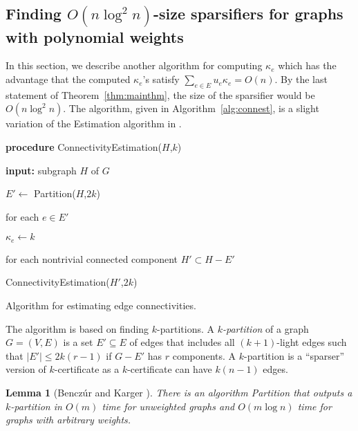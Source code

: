 \documentclass[11pt]{article}
\numberwithin{equation}{section}
\newenvironment{alg}{
    \begin{list}{}{
        \setlength{\itemsep}{2pt}
        \setlength{\parsep}{0pt}
        \setlength{\parskip}{0pt}
        \setlength{\topsep}{1pt}
    }
}
{
    \end{list}
}
\newtheorem{lemma}[theorem]{Lemma}
\newcommand{\AlgorithmName}[1]{\label{alg:#1}}
\newcommand{\Algorithm}[1]{Algorithm~\ref{alg:#1}}
\newcommand{\Theorem}[1]{Theorem~\ref{thm:#1}}
\begin{document}
\subsection{Finding $O(n\log^2 n)$-size sparsifiers for graphs with polynomial weights}

In this section, we describe another algorithm for computing $\kappa_e$
which has the advantage that the computed $\kappa_e$'s
satisfy $\sum_{e\in E}u_e\kappa_e=O(n)$. 
By the last statement of \Theorem{mainthm},
the size of the sparsifier would be $O(n\log^2 n)$.
The algorithm, given in \Algorithm{connest},
is a slight variation of the Estimation algorithm in \cite{BK}.

\begin{algorithm}
\begin{alg}
	\item	\textbf{procedure} ConnectivityEstimation($H$,$k$)
	\item	\textbf{input:} subgraph $H$ of $G$
	\item	$E'\leftarrow$ Partition($H$,$2k$)
	\item	for each $e\in E'$
        \begin{alg}
        \item	$\kappa_e\leftarrow k$
        \end{alg}
	\item	for each nontrivial connected component $H' \subset H-E'$
        \begin{alg}
    	\item	ConnectivityEstimation($H'$,$2k$)
        \end{alg}
\end{alg}
\caption{Algorithm for estimating edge connectivities.}
\AlgorithmName{connest}
\end{algorithm}

The algorithm is based on finding $k$-partitions.
A \emph{$k$-partition} of a graph $G=(V,E)$
is a set $E'\subseteq E$ of edges that includes all $(k+1)$-light edges
such that $|E'|\le 2 k(r-1)$ if $G-E'$ has $r$ components.
A $k$-partition is a ``sparser'' version of $k$-certificate
as a $k$-certificate can have $k(n-1)$ edges.

\begin{lemma}[Bencz\'ur and Karger \cite{BK}]
\label{alg:partition}
There is an algorithm Partition that outputs 
a $k$-partition in $O(m)$ time for unweighted graphs
and $O(m\log n)$ time for graphs with arbitrary weights.
\end{lemma}
\end{document}
